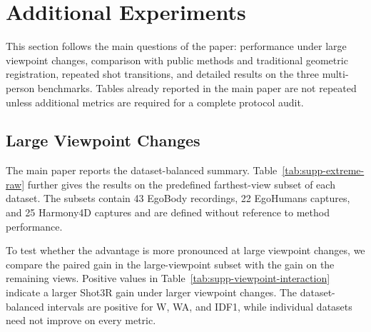 \clearpage
\section{Additional Experiments}
\label{app:full-results}
\suppressfloats[t]

This section follows the main questions of the paper: performance under large
viewpoint changes, comparison with public methods and traditional geometric
registration, repeated shot transitions, and detailed results on the three
multi-person benchmarks. Tables already reported in the main paper are not
repeated unless additional metrics are required for a complete protocol audit.

\subsection{Large Viewpoint Changes}
\label{app:cross-dataset-viewpoint}

The main paper reports the dataset-balanced summary. Table~\ref{tab:supp-extreme-raw}
further gives the results on the predefined farthest-view subset of each
dataset. The subsets contain 43 EgoBody recordings, 22 EgoHumans captures,
and 25 Harmony4D captures and are defined without reference to method
performance.

\begin{table}[t]
  \centering
  \caption{Results on the predefined large-viewpoint subsets. W/WA are in
  mm and camera ATE is in m (Sim(3) for EgoBody/Harmony4D and SE(3) for
  EgoHumans).}
  \label{tab:supp-extreme-raw}
  \supptablesize
  
\end{table}

To test whether the advantage is more pronounced at large viewpoint changes, we compare the
paired gain in the large-viewpoint subset with the gain on the remaining
views. Positive values in Table~\ref{tab:supp-viewpoint-interaction} indicate
a larger Shot3R gain under larger viewpoint changes. The dataset-balanced intervals are
positive for W, WA, and IDF1, while individual datasets need not improve on
every metric.

